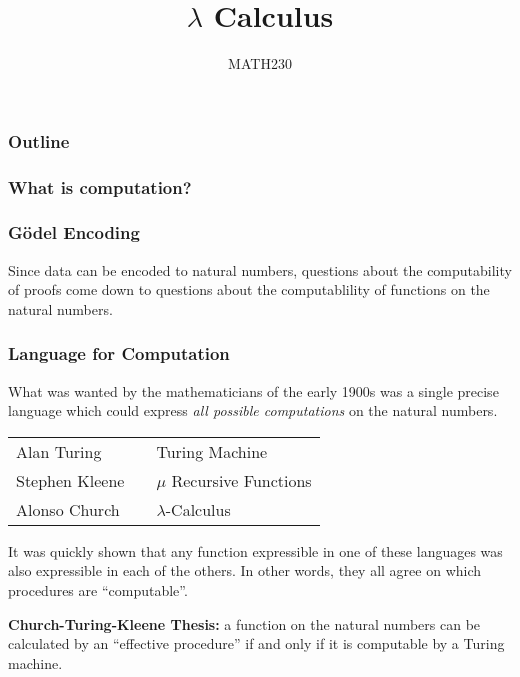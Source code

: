 \documentclass{beamer}
\title{$\lambda$ Calculus}
\author{MATH230}
\institute{Te Kura P\=angarau \\ Te Whare W\=ananga o Waitaha}
\date{}
\begin{document}
\begin{frame}

  \titlepage

\end{frame}

\begin{frame}
  \frametitle{Outline}

  \tableofcontents

\end{frame}

\begin{frame}
	\frametitle{What is computation?}

	

\end{frame}

\begin{frame}
	\frametitle{G\"{o}del Encoding}

	Since data can be encoded to natural numbers, questions about the computability of proofs come down to questions about the computablility of functions on the natural numbers. 

\end{frame}

\begin{frame}
	\frametitle{Language for Computation}
	What was wanted by the mathematicians of the early 1900s was a single precise language which could express \emph{all possible computations} on the natural numbers.
	
	
	\begin{center}
		\begin{tabular}{l c l}
			Alan Turing & & Turing Machine \\
			Stephen Kleene & & $\mu$ Recursive Functions \\
			Alonso Church & & $\lambda$-Calculus
		\end{tabular}
	\end{center}

	It was quickly shown that any function expressible in one of these languages was also expressible in each of the others. In other words, they all agree on which procedures are ``computable''. 

	{\bf Church-Turing-Kleene Thesis:} a function on the natural numbers can be calculated by an ``effective procedure'' if and only if it is computable by a Turing machine. 
\end{frame}
\end{document}
